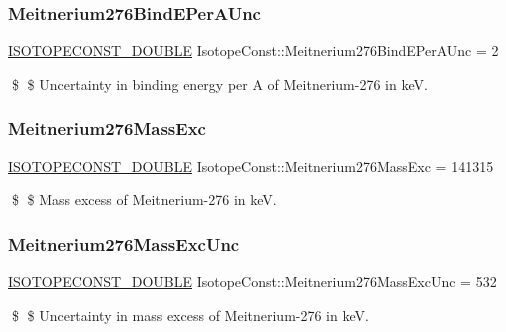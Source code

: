 \subsubsection{\texorpdfstring{Meitnerium276\+Bind\+E\+Per\+A\+Unc}{Meitnerium276BindEPerAUnc}}
{\footnotesize\ttfamily \mbox{\hyperlink{group___isotope_const-_macros_ga8f45a7272ce02c0b4c65c44636ed719a}{I\+S\+O\+T\+O\+P\+E\+C\+O\+N\+S\+T\+\_\+\+D\+O\+U\+B\+LE}} Isotope\+Const\+::\+Meitnerium276\+Bind\+E\+Per\+A\+Unc = 2}

\$ \$ Uncertainty in binding energy per A of Meitnerium-\/276 in keV. \mbox{\label{group___isotope_const-_meitnerium-_mt276_gae7a62fe012ae99e4174fbacb908f3e30}} 
\subsubsection{\texorpdfstring{Meitnerium276\+Mass\+Exc}{Meitnerium276MassExc}}
{\footnotesize\ttfamily \mbox{\hyperlink{group___isotope_const-_macros_ga8f45a7272ce02c0b4c65c44636ed719a}{I\+S\+O\+T\+O\+P\+E\+C\+O\+N\+S\+T\+\_\+\+D\+O\+U\+B\+LE}} Isotope\+Const\+::\+Meitnerium276\+Mass\+Exc = 141315}

\$ \$ Mass excess of Meitnerium-\/276 in keV. \mbox{\label{group___isotope_const-_meitnerium-_mt276_ga9e3f887e2b7409bcf8df2178fd420edc}} 
\subsubsection{\texorpdfstring{Meitnerium276\+Mass\+Exc\+Unc}{Meitnerium276MassExcUnc}}
{\footnotesize\ttfamily \mbox{\hyperlink{group___isotope_const-_macros_ga8f45a7272ce02c0b4c65c44636ed719a}{I\+S\+O\+T\+O\+P\+E\+C\+O\+N\+S\+T\+\_\+\+D\+O\+U\+B\+LE}} Isotope\+Const\+::\+Meitnerium276\+Mass\+Exc\+Unc = 532}

\$ \$ Uncertainty in mass excess of Meitnerium-\/276 in keV. \mbox{\label{group___isotope_const-_meitnerium-_mt276_ga56bc323cc3c00e189c9d78338ca899aa}} 
